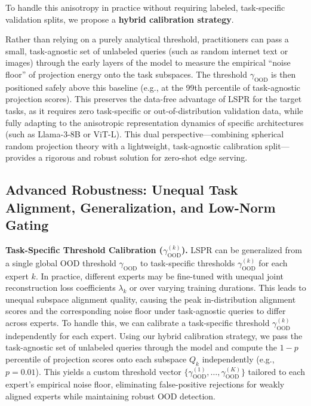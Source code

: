 To handle this anisotropy in practice without requiring labeled, task-specific validation splits, we propose a \textbf{hybrid calibration strategy}. 

Rather than relying on a purely analytical threshold, practitioners can pass a small, task-agnostic set of unlabeled queries (such as random internet text or images) through the early layers of the model to measure the empirical ``noise floor'' of projection energy onto the task subspaces. The threshold $\gamma_{\text{OOD}}$ is then positioned safely above this baseline (e.g., at the 99th percentile of task-agnostic projection scores). This preserves the data-free advantage of LSPR for the target tasks, as it requires zero task-specific or out-of-distribution validation data, while fully adapting to the anisotropic representation dynamics of specific architectures (such as Llama-3-8B or ViT-L). This dual perspective—combining spherical random projection theory with a lightweight, task-agnostic calibration split—provides a rigorous and robust solution for zero-shot edge serving.

\subsection{Advanced Robustness: Unequal Task Alignment, Generalization, and Low-Norm Gating}
\label{subsec:method_advanced}

\textbf{Task-Specific Threshold Calibration ($\gamma_{\text{OOD}}^{(k)}$).} LSPR can be generalized from a single global OOD threshold $\gamma_{\text{OOD}}$ to task-specific thresholds $\gamma_{\text{OOD}}^{(k)}$ for each expert $k$. In practice, different experts may be fine-tuned with unequal joint reconstruction loss coefficients $\lambda_k$ or over varying training durations. This leads to unequal subspace alignment quality, causing the peak in-distribution alignment scores and the corresponding noise floor under task-agnostic queries to differ across experts. To handle this, we can calibrate a task-specific threshold $\gamma_{\text{OOD}}^{(k)}$ independently for each expert. Using our hybrid calibration strategy, we pass the task-agnostic set of unlabeled queries through the model and compute the $1-p$ percentile of projection scores onto each subspace $Q_k$ independently (e.g., $p = 0.01$). This yields a custom threshold vector $\{\gamma_{\text{OOD}}^{(1)}, \dots, \gamma_{\text{OOD}}^{(K)}\}$ tailored to each expert's empirical noise floor, eliminating false-positive rejections for weakly aligned experts while maintaining robust OOD detection.

